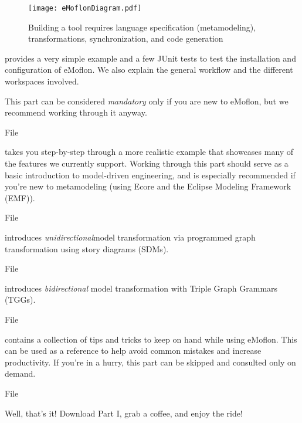 \begin{figure}[htbp]
	\centering
  \texttt{[image: eMoflonDiagram.pdf]}
	\caption{Building a tool requires language specification (metamodeling), transformations, synchronization, and code generation}
	\label{fig:transformationModel}
\end{figure}
\begin{description}

\pagebreak

\item[Part I: Installation and set up] provides a very simple example and a few JUnit tests to test the installation and configuration of eMoflon.
We also explain the general workflow and the different workspaces involved.

This part can be considered \emph{mandatory} only if you are new to eMoflon, but we recommend working through it anyway.

{\footnotesize File \dlPartOne}

\item[Part II: Ecore] takes you step-by-step through a more realistic example that showcases many of the features we currently support.
Working through this part should serve as a basic introduction to model-driven engineering, and is especially recommended if you're new to metamodeling
(using Ecore and the Eclipse Modeling Framework (EMF)).

{\footnotesize File \dlPartTwo}

\item[Part III: Story Driven Modelling (SDM)] introduces \emph{unidirectional}\linebreak model transformation via programmed graph transformation using story diagrams (SDMs).

{\footnotesize File \dlPartThree}

\item[Part IV: TGGs] introduces \emph{bidirectional} model transformation with Triple Graph Grammars (TGGs).

{\footnotesize File \dlPartFour}

\item[Part V: Miscellaneous] contains a collection of tips and tricks to keep
on hand while using eMoflon. This can be used as a reference to help avoid common mistakes and increase productivity. If you're in a hurry, this part can be skipped and consulted only on demand.

{\footnotesize File \dlPartFive}

\end{description}

Well, that's it! Download Part I, grab a coffee, and enjoy the ride!
